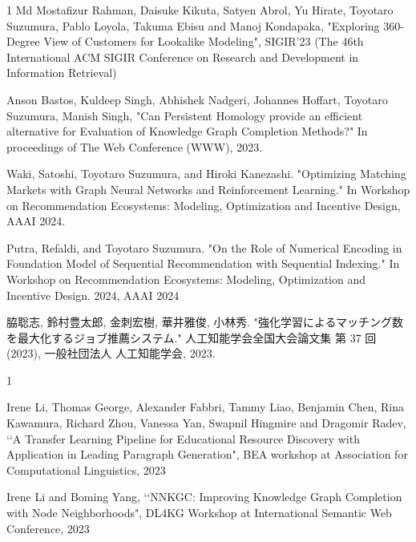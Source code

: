 \begin{査読付}{1}
Md Mostafizur Rahman, Daisuke Kikuta, Satyen Abrol, Yu Hirate, Toyotaro Suzumura, Pablo Loyola, Takuma Ebisu and Manoj Kondapaka, "Exploring 360-Degree View of Customers for Lookalike Modeling",  SIGIR'23 (The 46th International ACM
SIGIR Conference on Research and Development in Information
Retrieval) 

Anson Bastos, Kuldeep Singh, Abhishek Nadgeri, Johannes Hoffart, Toyotaro Suzumura, Manish Singh,
"Can Persistent Homology provide an efficient alternative for Evaluation of Knowledge Graph Completion Methods?"
In proceedings of The Web Conference (WWW), 2023.

Waki, Satoshi, Toyotaro Suzumura, and Hiroki Kanezashi. "Optimizing Matching Markets with Graph Neural Networks and Reinforcement Learning." In Workshop on Recommendation Ecosystems: Modeling, Optimization and Incentive Design, AAAI 2024.

Putra, Refaldi, and Toyotaro Suzumura. "On the Role of Numerical Encoding in Foundation Model of Sequential Recommendation with Sequential Indexing." In Workshop on Recommendation Ecosystems: Modeling, Optimization and Incentive Design. 2024, AAAI 2024


脇聡志, 鈴村豊太郎, 金刺宏樹, 華井雅俊, 小林秀. "強化学習によるマッチング数を最大化するジョブ推薦システム." 人工知能学会全国大会論文集 第 37 回 (2023), 一般社団法人 人工知能学会, 2023.


\begin{査読付}{1}  %

Irene Li, Thomas George, Alexander Fabbri, Tammy Liao, Benjamin Chen, Rina Kawamura, Richard Zhou, Vanessa Yan, Swapnil Hingmire and Dragomir Radev, \lq\lq A Transfer Learning Pipeline for Educational Resource Discovery with Application in Leading Paragraph Generation", BEA workshop at Association for Computational Linguistics, 2023

Irene Li and Boming Yang, \lq\lq NNKGC: Improving Knowledge Graph Completion with Node Neighborhoods", DL4KG Workshop at International Semantic Web Conference, 2023


\end{査読付}
\end{査読付}
